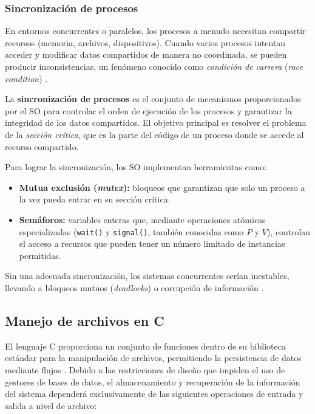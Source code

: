 \subsubsection{Sincronización de procesos}

En entornos concurrentes o paralelos, los procesos a menudo necesitan compartir recursos (memoria, archivos, dispositivos). Cuando varios procesos intentan acceder y modificar datos compartidos de manera no coordinada, se pueden producir inconsistencias, un fenómeno conocido como \textit{condición de carrera} (\textit{race condition}) \cite{silberschatz:os-concepts:2018}.

La \textbf{sincronización de procesos} es el conjunto de mecanismos proporcionados por el SO para controlar el orden de ejecución de los procesos y garantizar la integridad de los datos compartidos. El objetivo principal es resolver el problema de la \textit{sección crítica}, que es la parte del código de un proceso donde se accede al recurso compartido.

Para lograr la sincronización, los SO implementan herramientas como:
\begin{itemize}[leftmargin=*]
    \item \textbf{Mutua exclusión (\textit{mutex}):} bloqueos que garantizan que solo un proceso a la vez pueda entrar en su sección crítica.
    \item \textbf{Semáforos:} variables enteras que, mediante operaciones atómicas especializadas (\texttt{wait()} y \texttt{signal()}, también conocidas como $P$ y $V$), controlan el acceso a recursos que pueden tener un número limitado de instancias permitidas.
\end{itemize}
Sin una adecuada sincronización, los sistemas concurrentes serían inestables, llevando a bloqueos mutuos (\textit{deadlocks}) o corrupción de información \cite{tanenbaum:modern-os:2014}.


\subsection{Manejo de archivos en C}
\label{sec:prac02:archivos}

El lenguaje C proporciona un conjunto de funciones dentro de su biblioteca estándar para la manipulación de archivos, permitiendo la persistencia de datos mediante flujos \cite{marquez:unix-programacion:2015}. Debido a las restricciones de diseño que impiden el uso de gestores de bases de datos, el almacenamiento y recuperación de la información del sistema dependerá exclusivamente de las siguientes operaciones de entrada y salida a nivel de archivo:

